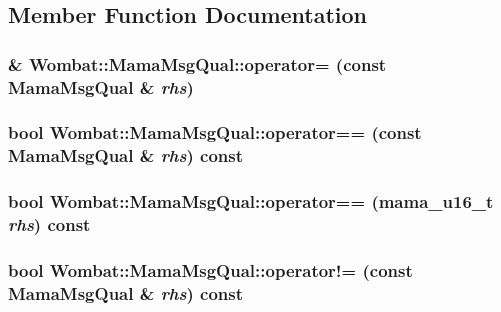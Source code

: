 \subsection{Member Function Documentation}
\hypertarget{classWombat_1_1MamaMsgQual_a41c08d70ac1051df0718120b26671b90}{
\subsubsection[{operator=}]{\& Wombat::MamaMsgQual::operator= (const {\bf MamaMsgQual} \& {\em rhs})}}
\label{classWombat_1_1MamaMsgQual_a41c08d70ac1051df0718120b26671b90}
\hypertarget{classWombat_1_1MamaMsgQual_a673126e2c79f9dbb2f4334182218f9fe}{
\subsubsection[{operator==}]{\setlength{\rightskip}{0pt plus 5cm}bool Wombat::MamaMsgQual::operator== (const {\bf MamaMsgQual} \& {\em rhs}) const}}
\label{classWombat_1_1MamaMsgQual_a673126e2c79f9dbb2f4334182218f9fe}
\hypertarget{classWombat_1_1MamaMsgQual_afa761f4ed9ed2b2bd33be92969c31920}{
\subsubsection[{operator==}]{\setlength{\rightskip}{0pt plus 5cm}bool Wombat::MamaMsgQual::operator== (mama\_\-u16\_\-t {\em rhs}) const}}
\label{classWombat_1_1MamaMsgQual_afa761f4ed9ed2b2bd33be92969c31920}
\hypertarget{classWombat_1_1MamaMsgQual_abf7019cb1c95421816e3b31791657579}{
\subsubsection[{operator!=}]{\setlength{\rightskip}{0pt plus 5cm}bool Wombat::MamaMsgQual::operator!= (const {\bf MamaMsgQual} \& {\em rhs}) const}}

